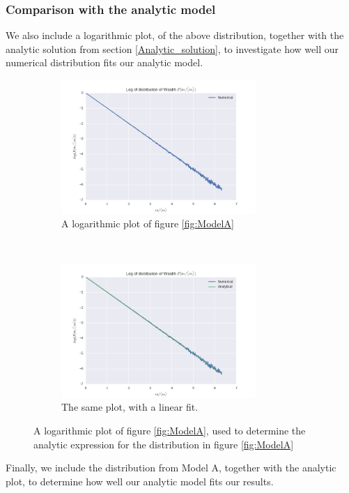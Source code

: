 \documentclass[a4paper, 10pt]{article}
\begin{document}
\subsubsection{Comparison with the analytic model}
We also include a logarithmic plot, of the above distribution, together with the analytic solution from section \ref{Analytic_solution}, to investigate how well our numerical distribution fits our analytic model.
\begin{figure}[!ht]
    \centering
    \begin{subfigure}[H!]{0.5\textwidth}
        \centering
        \includegraphics[height=2.0in]{logDistLamb0.png}
        \caption{A logarithmic plot of figure \ref{fig:ModelA}}\label{fig:ModelA_log_raw}
    \end{subfigure}%
    ~ 
    \begin{subfigure}[H!]{0.5\textwidth}
        \centering
        \includegraphics[height=2.0in]{logDistLamb0WAnalyt.png}
        \caption{The same plot, with a linear fit.}\label{fig:ModelA_log_fit}
    \end{subfigure}
    \caption{A logarithmic plot of figure \ref{fig:ModelA}, used to determine the analytic expression for the distribution in figure \ref{fig:ModelA}}\label{fig:ModelA__log}
\end{figure}
Finally, we include the distribution from Model A, together with the analytic plot, to determine how well our analytic model fits our results.
\end{document}
